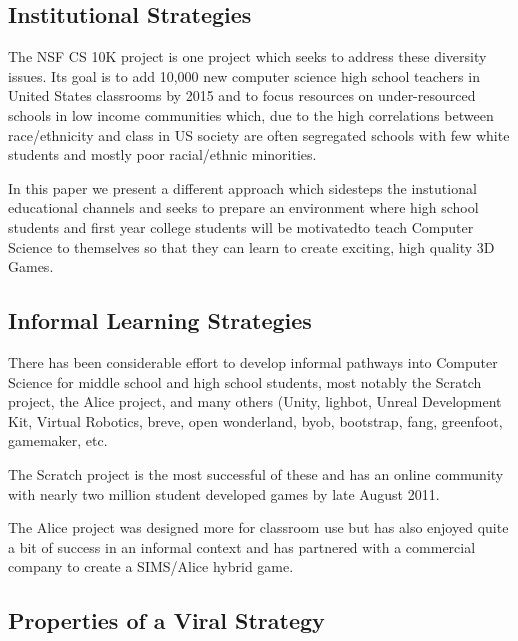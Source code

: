 \documentclass{sig-alternate}
\begin{document}
\subsection{Institutional Strategies}

The NSF CS 10K project is one project which seeks to address these diversity issues. Its goal is to
add 10,000 new computer science high school teachers in United States classrooms by 2015 and
to focus resources on under-resourced schools in low income communities which, due to the high
correlations between race/ethnicity and class in US society are often segregated schools with few white
students and mostly poor racial/ethnic minorities.

In this paper we present a different approach which sidesteps the instutional educational channels
and seeks to prepare an environment where high school students and first year college students will be
motivatedto teach Computer Science to themselves so that they can learn to create exciting, high quality
3D Games.

\subsection{Informal Learning Strategies}
There has been considerable effort to develop informal pathways into Computer Science for
middle school and high school students, most notably the Scratch project, the Alice project,
and many others (Unity, lighbot, Unreal Development Kit, Virtual Robotics, breve, open wonderland,
byob, bootstrap, fang, greenfoot, gamemaker, etc.

The Scratch project is the most successful of these and has an online community with nearly two million student developed games by late August 2011. 

The Alice project was designed more for classroom use but has also enjoyed quite a bit of success in an informal context and has partnered with a commercial company to create a SIMS/Alice hybrid game.

\subsection{Properties of a Viral  Strategy}
\end{document}
